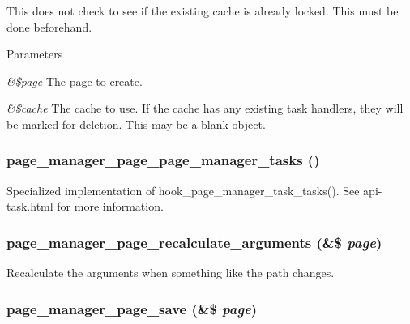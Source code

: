 This does not check to see if the existing cache is already locked. This must be done beforehand.


\begin{DoxyParams}{Parameters}
\item[{\em \&\$page}]The page to create. \item[{\em \&\$cache}]The cache to use. If the cache has any existing task handlers, they will be marked for deletion. This may be a blank object. \end{DoxyParams}
\hypertarget{page_8inc_aff2e5105c19b3717e3cecc658251c474}{
\subsubsection[{page\_\-manager\_\-page\_\-page\_\-manager\_\-tasks}]{\setlength{\rightskip}{0pt plus 5cm}page\_\-manager\_\-page\_\-page\_\-manager\_\-tasks ()}}
\label{page_8inc_aff2e5105c19b3717e3cecc658251c474}
Specialized implementation of hook\_\-page\_\-manager\_\-task\_\-tasks(). See api-\/task.html for more information. \hypertarget{page_8inc_aeb93001c1f88906988ee43110212c4f5}{
\subsubsection[{page\_\-manager\_\-page\_\-recalculate\_\-arguments}]{\setlength{\rightskip}{0pt plus 5cm}page\_\-manager\_\-page\_\-recalculate\_\-arguments (\&\$ {\em page})}}
\label{page_8inc_aeb93001c1f88906988ee43110212c4f5}
Recalculate the arguments when something like the path changes. \hypertarget{page_8inc_a2201f36620dbaa3f8a3a44b69870c91c}{
\subsubsection[{page\_\-manager\_\-page\_\-save}]{\setlength{\rightskip}{0pt plus 5cm}page\_\-manager\_\-page\_\-save (\&\$ {\em page})}}
